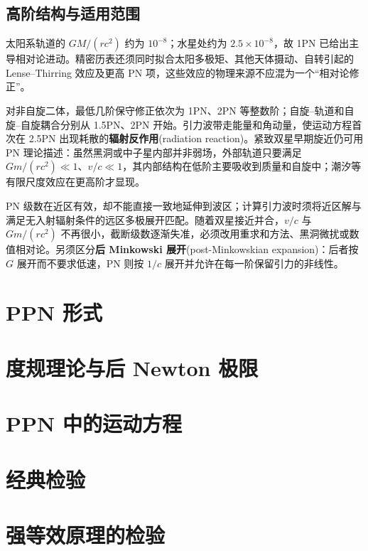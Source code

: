 \subsection{高阶结构与适用范围}

太阳系轨道的 $GM/(rc^2)$ 约为 $10^{-8}$；水星处约为 $2.5\times10^{-8}$，故 1PN 已给出主导相对论进动。精密历表还须同时拟合太阳多极矩、其他天体摄动、自转引起的 Lense--Thirring 效应及更高 PN 项，这些效应的物理来源不应混为一个“相对论修正”。

对非自旋二体，最低几阶保守修正依次为 1PN、2PN 等整数阶；自旋--轨道和自旋--自旋耦合分别从 1.5PN、2PN 开始。引力波带走能量和角动量，使运动方程首次在 2.5PN 出现耗散的\textbf{辐射反作用}(radiation reaction)。紧致双星早期旋近仍可用 PN 理论描述：虽然黑洞或中子星内部并非弱场，外部轨道只要满足 $Gm/(rc^2)\ll1$、$v/c\ll1$，其内部结构在低阶主要吸收到质量和自旋中；潮汐等有限尺度效应在更高阶才显现。

PN 级数在近区有效，却不能直接一致地延伸到波区；计算引力波时须将近区解与满足无入射辐射条件的远区多极展开匹配。随着双星接近并合，$v/c$ 与 $Gm/(rc^2)$ 不再很小，截断级数逐渐失准，必须改用重求和方法、黑洞微扰或数值相对论。另须区分\textbf{后 Minkowski 展开}(post-Minkowskian expansion)：后者按 $G$ 展开而不要求低速，PN 则按 $1/c$ 展开并允许在每一阶保留引力的非线性。

\section{PPN 形式}

\section{度规理论与后 Newton 极限}

\section{PPN 中的运动方程}

\section{经典检验}

\section{强等效原理的检验}

